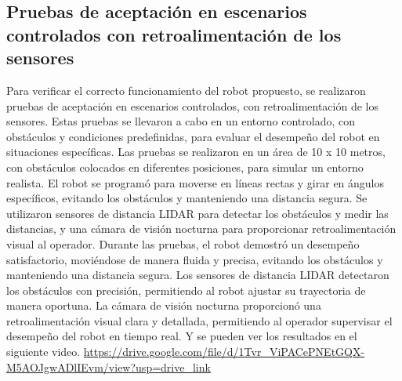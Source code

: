 \subsection{Pruebas de aceptaci\'on en escenarios controlados con retroalimentaci\'on de los sensores} %
\label{sub:Pruebas de Aceptaci\'on en escenarios controlados con retroalimentaci\'on de los sensores}
    Para verificar el correcto funcionamiento del robot propuesto, se realizaron pruebas de aceptaci\'on en escenarios controlados, 
        con retroalimentaci\'on de los sensores. Estas pruebas se llevaron a cabo en un entorno controlado, con obst\'aculos 
        y condiciones predefinidas, para evaluar el desempe\~no del robot en situaciones espec\'ificas. 
    \vskip 0.5cm
    Las pruebas se realizaron en un \'area de 10 x 10 metros, con obst\'aculos colocados en diferentes posiciones, 
        para simular un entorno realista. El robot se program\'o para moverse en l\'ineas rectas y girar en \'angulos 
        espec\'ificos, evitando los obst\'aculos y manteniendo una distancia segura. Se utilizaron sensores de distancia 
        LIDAR para detectar los obst\'aculos y medir las distancias, y una c\'amara de visi\'on nocturna para 
        proporcionar retroalimentaci\'on visual al operador.
    \vskip 0.5cm
    Durante las pruebas, el robot demostr\'o un desempe\~no satisfactorio, movi\'endose de manera fluida y precisa, 
        evitando los obst\'aculos y manteniendo una distancia segura. Los sensores de distancia LIDAR detectaron
        los obst\'aculos con precisi\'on, permitiendo al robot ajustar su trayectoria de manera oportuna. La c\'amara
        de visi\'on nocturna proporcion\'o una retroalimentaci\'on visual clara y detallada, permitiendo al operador
        supervisar el desempe\~no del robot en tiempo real. Y se pueden ver los resultados en el siguiente video.
    \vskip 0.5cm
    \url{https://drive.google.com/file/d/1Tvr_ViPACePNEtGQX-M5AOJgwADlIEvm/view?usp=drive_link}
